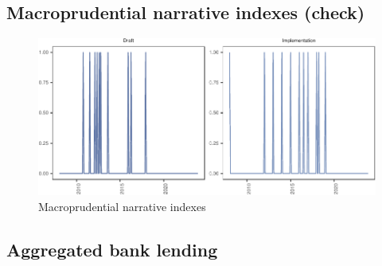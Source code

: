 \documentclass[
  letterpaper,
  DIV=11,
  numbers=noendperiod]{scrartcl}
\begin{document}
\newpage

\hypertarget{macroprudential-narrative-indexes-check}{%
\subsection{Macroprudential narrative indexes
(check)}\label{macroprudential-narrative-indexes-check}}

\begin{figure}[H]

{\centering \includegraphics{UP_Paper_files/figure-pdf/fig-macro_narrative_indexes-1.pdf}

}

\caption{\label{fig-macro_narrative_indexes}Macroprudential narrative
indexes}

\end{figure}

\newpage

\hypertarget{aggregated-bank-lending}{%
\subsection{Aggregated bank lending}\label{aggregated-bank-lending}}
\end{document}
